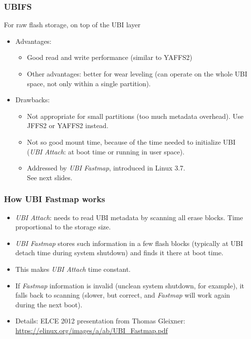\begin{frame}
\frametitle{UBIFS}
For raw flash storage, on top of the UBI layer
\begin{itemize}
\item Advantages:
      \begin{itemize}
      \item Good read and write performance (similar to YAFFS2)
      \item Other advantages: better for wear leveling (can operate on the
	    whole UBI space, not only within a single partition).
      \end{itemize}
\item Drawbacks:
      \begin{itemize}
      \item Not appropriate for small partitions (too much metadata
	    overhead). Use JFFS2 or YAFFS2 instead.
      \item Not so good mount time, because of the time needed
            to initialize UBI ({\em UBI Attach}: at boot time or running
             in user space).
      \item Addressed by {\em UBI Fastmap}, introduced in Linux 3.7. \\
            See next slides.
      \end{itemize}
\end{itemize}
\end{frame}

\begin{frame}
\frametitle{How UBI Fastmap works}
\begin{itemize}
\item {\em UBI Attach}: needs to read UBI metadata by
      scanning all erase blocks. Time proportional
      to the storage size.
\item {\em UBI Fastmap} stores such information in a few flash
      blocks (typically at UBI detach time during system
      shutdown) and finds it there at boot time.
\item This makes {\em UBI Attach} time constant.
\item If {\em Fastmap} information is invalid (unclean system
      shutdown, for example), it falls back to scanning
      (slower, but correct, and {\em Fastmap} will work again
      during the next boot).
\item Details: ELCE 2012 presentation from Thomas Gleixner:
      \url{https://elinux.org/images/a/ab/UBI_Fastmap.pdf}
\end{itemize}
\end{frame}

